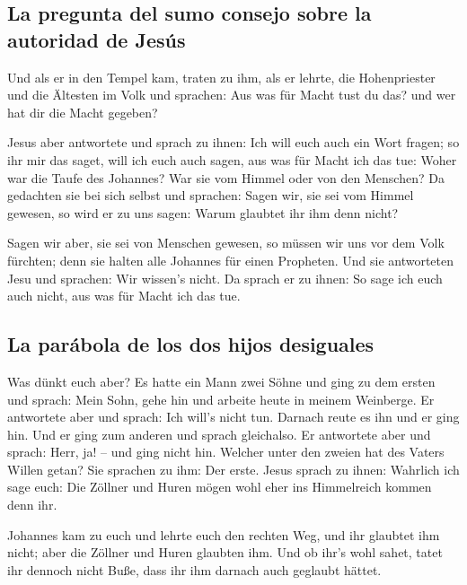 \hypertarget{la-pregunta-del-sumo-consejo-sobre-la-autoridad-de-jesuxfas}{%
\subsection{La pregunta del sumo consejo sobre la autoridad de
Jesús}\label{la-pregunta-del-sumo-consejo-sobre-la-autoridad-de-jesuxfas}}

 Und als er in den Tempel kam, traten zu ihm, als er
lehrte, die Hohenpriester und die Ältesten im Volk und sprachen: Aus was
für Macht tust du das? und wer hat dir die Macht gegeben?

 Jesus aber antwortete und sprach zu ihnen: Ich will euch
auch ein Wort fragen; so ihr mir das saget, will ich euch auch sagen,
aus was für Macht ich das tue:  Woher war die Taufe des
Johannes? War sie vom Himmel oder von den Menschen? Da gedachten sie bei
sich selbst und sprachen: Sagen wir, sie sei vom Himmel gewesen, so wird
er zu uns sagen: Warum glaubtet ihr ihm denn nicht?

 Sagen wir aber, sie sei von Menschen gewesen, so müssen
wir uns vor dem Volk fürchten; denn sie halten alle Johannes für einen
Propheten.  Und sie antworteten Jesu und sprachen: Wir
wissen's nicht. Da sprach er zu ihnen: So sage ich euch auch nicht, aus
was für Macht ich das tue.

\hypertarget{la-paruxe1bola-de-los-dos-hijos-desiguales}{%
\subsection{La parábola de los dos hijos
desiguales}\label{la-paruxe1bola-de-los-dos-hijos-desiguales}}

 Was dünkt euch aber? Es hatte ein Mann zwei Söhne und
ging zu dem ersten und sprach: Mein Sohn, gehe hin und arbeite heute in
meinem Weinberge.  Er antwortete aber und sprach: Ich
will's nicht tun. Darnach reute es ihn und er ging hin. 
Und er ging zum anderen und sprach gleichalso. Er antwortete aber und
sprach: Herr, ja! -- und ging nicht hin.  Welcher unter
den zweien hat des Vaters Willen getan? Sie sprachen zu ihm: Der erste.
Jesus sprach zu ihnen: Wahrlich ich sage euch: Die Zöllner und Huren
mögen wohl eher ins Himmelreich kommen denn ihr.

 Johannes kam zu euch und lehrte euch den rechten Weg,
und ihr glaubtet ihm nicht; aber die Zöllner und Huren glaubten ihm. Und
ob ihr's wohl sahet, tatet ihr dennoch nicht Buße, dass ihr ihm darnach
auch geglaubt hättet.

